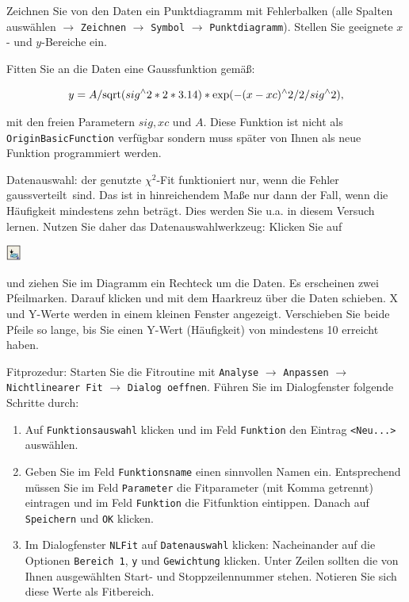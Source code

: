 \documentclass[landscape,twocolumn]{article}
\begin{document}
\begin{itemize}
Zeichnen Sie von den Daten ein Punktdiagramm mit Fehlerbalken (alle Spalten ausw\"{a}hlen  $\rightarrow$ \verb"Zeichnen" $\rightarrow$ \verb"Symbol" $\rightarrow$ \verb"Punktdiagramm"). Stellen Sie geeignete $x$- und $y$-Bereiche ein.

Fitten Sie an die Daten eine Gaussfunktion gem\"{a}{\ss}:

\begin{equation}\notag
    y= A/\text{sqrt}(sig^\wedge 2*2*3.14)*\text{exp}(-(x-xc)^\wedge 2/2/sig^\wedge2),
\end{equation}

mit den freien Parametern $sig, xc$ und $A$. Diese Funktion ist nicht als \verb"OriginBasicFunction" verf\"{u}gbar sondern muss sp\"{a}ter von Ihnen als neue Funktion programmiert werden.


Datenauswahl: der genutzte $\chi^2$-Fit funktioniert nur, wenn die Fehler \glqq gaussverteilt\grqq~sind. Das ist in hinreichendem Ma{\ss}e nur dann der Fall, wenn die H\"{a}ufigkeit mindestens zehn betr\"{a}gt. Dies werden Sie u.a. in diesem Versuch lernen. Nutzen Sie daher das Datenauswahlwerkzeug: Klicken Sie auf  \begin{minipage}{5mm}
\includegraphics[height=5mm]{icon_auswahl.eps}\end{minipage} und ziehen Sie im Diagramm ein Rechteck um die Daten. Es erscheinen zwei Pfeilmarken. Darauf klicken und mit dem Haarkreuz \"{u}ber die Daten schieben. X und Y-Werte werden in einem kleinen Fenster angezeigt. Verschieben Sie beide Pfeile so lange, bis Sie einen Y-Wert (H\"{a}ufigkeit) von mindestens 10 erreicht haben.



Fitprozedur: Starten Sie die Fitroutine mit \verb"Analyse"  $\rightarrow$ \verb"Anpassen" $\rightarrow$ \verb"Nichtlinearer Fit" $\rightarrow$ \verb"Dialog oeffnen". F\"{u}hren Sie im Dialogfenster folgende Schritte durch:
\begin{enumerate}
  \item Auf \verb"Funktionsauswahl" klicken und im Feld \verb"Funktion" den Eintrag \verb"<Neu...>" ausw\"{a}hlen.
  \item Geben Sie im Feld \verb"Funktionsname" einen sinnvollen Namen ein. Entsprechend m\"{u}ssen Sie im Feld \verb"Parameter" die Fitparameter (mit Komma getrennt) eintragen und im Feld \verb"Funktion" die Fitfunktion eintippen. Danach auf \verb"Speichern" und \verb"OK"  klicken.
  \item  Im Dialogfenster \verb"NLFit"  auf \verb"Datenauswahl" klicken: Nacheinander auf die Optionen
\verb"Bereich 1", \verb"y" und \verb"Gewichtung" klicken. Unter Zeilen sollten die von Ihnen ausgew\"{a}hlten Start- und Stoppzeilennummer stehen.  Notieren Sie sich diese Werte als \glqq Fitbereich\grqq.


\end{enumerate}
\end{itemize}
\end{document}
